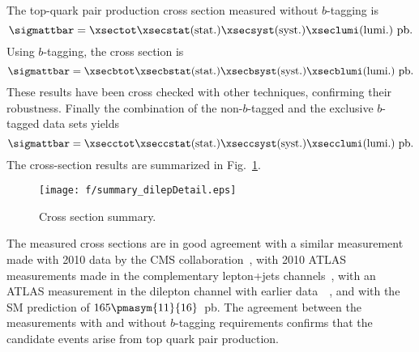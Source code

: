 The top-quark pair production cross section measured without
$b$-tagging is
\[
\sigmattbar=\mathrm{}\xsectot \xsecstat \mathrm{(stat.)}\xsecsyst \mathrm{(syst.)} \xseclumi \mathrm{(lumi.)}~\rm pb.
\]
Using $b$-tagging, the cross section is
\[
\sigmattbar=\mathrm{}\xsecbtot \xsecbstat  \mathrm{(stat.)}\xsecbsyst \mathrm{(syst.)} \xsecblumi  \mathrm{(lumi.)}~\rm pb.
\]
These results have been cross checked with other techniques,
confirming their robustness.
Finally the combination of the non-$b$-tagged and the exclusive $b$-tagged
data sets yields
\[
\sigmattbar=\mathrm{}\xsecctot \xseccstat  \mathrm{(stat.)}\xseccsyst \mathrm{(syst.)} \xsecclumi  \mathrm{(lumi.)}~\rm pb.
\]
The cross-section results are summarized in Fig.~\ref{fig:XsecSummary}.

\begin{figure}[!h]
\centering
\texttt{[image: f/summary\_dilepDetail.eps]}
    \caption{ Cross section summary.}
    \label{fig:XsecSummary}
\end{figure}

The measured cross sections are in good agreement with a similar
measurement made with 2010 data by the CMS
collaboration~\cite{Chatrchyan:2011nb}, with 2010 ATLAS measurements
made in the complementary lepton+jets
channels~\cite{ATLAS-CONF-2011-023,ATLAS-CONF-2011-035}, with an
ATLAS measurement in the dilepton channel with earlier
data~~\cite{ATL-CONF-2011-034}, and with the SM prediction of
$165\pmasym{11}{16}$~pb. The agreement between the measurements with
and without $b$-tagging requirements confirms that the candidate
events arise from top quark pair production.
